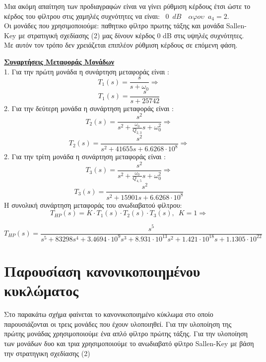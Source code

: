 \documentclass{article}
\begin{document}
{{\large{}
Μια ακόμη απαίτηση των προδιαγραφών είναι να γίνει ρύθμιση κέρδους έτσι ώστε το κέρδος του φίλτρου
στις χαμηλές συχνότητες να είναι: $\boxed{\enspace 0 \enspace dB \enspace} \enspace αφου \enspace a_4 =2$. \\
Οι μονάδες που χρησιμοποιούμε: παθητικο φίλτρο πρωτης τάξης και μονάδα Sallen-Key με  στρατιγική σχεδίασης (2) μας δίνουν κέρδος 0 dB στις υψηλές συχνότητες. Με αυτόν τον τρόπο δεν χρειάζεται επιπλέον ρύθμιση κέρδους σε επόμενη φάση. \\[0.4\baselineskip]
\large{ \underline{\textbf{Συναρτήσεις Μεταφοράς Μονάδων}} \\[0.4\baselineskip]
\large{}
1. Για την πρώτη μονάδα η συνάρτηση μεταφοράς είναι :
\begin{equation*}
T_1(s) = \frac{s}{s+ω_{0}} \Rightarrow
\end{equation*}
 \begin{equation*}
\boxed{T_1(s) = \frac{s}{s+25742} }
\end{equation*}
2. Για την δεύτερη μονάδα η συνάρτηση μεταφοράς είναι :
\begin{equation*}
T_2(s) = \frac{s^2}{s^2+ \frac{ω_{0}}{Q_{2,3}}s+ {ω_{0}^2}} \Rightarrow
\end{equation*}
\begin{equation*}
\boxed{T_2(s) = \frac{s^2}{s^2+ 41655s+ 6.6268 \cdot 10^8}} \Rightarrow
\end{equation*}
2. Για την τρίτη μονάδα η συνάρτηση μεταφοράς είναι :
\begin{equation*}
T_3(s) = \frac{s^2}{s^2+ \frac{ω_{0}}{Q_{4,5}}s+ {ω_{0}^2}}
\Rightarrow
\end{equation*}
\begin{equation*}
\boxed{T_3(s) =  \frac{s^2}{s^2+ 15901s+ 6.6268 \cdot 10^8}}
\end{equation*}
Η συνολική συνάρτηση μεταφοράς του ανωδιαβατού φίλτρου:
\begin{equation*}
T_{HP}(s) = Κ \cdot T_1(s) \cdot T_2(s) \cdot T_3(s), \enspace K=1
 \Rightarrow
\end{equation*}
\begin{changemargin}{-1.6cm}{0.5cm}
\begin{equation*}
\boxed{T_{HP}(s) = \frac{s^5}{s^5+83298s^4+3.4694\cdot10^9s^3+8.931\cdot 10^{13}s^2 + 1.421\cdot 10^{18}s +1.1305\cdot 10^{22}}}
\end{equation*}
\end{changemargin}
\newpage
\section*{Παρουσίαση κανονικοποιημένου κυκλώματος}
Στο παρακάτω σχήμα φαίνεται το κανονικοποιημένο κύκλωμα στο οποίο παρουσιάζονται οι τρεις μονάδες που έχουν υλοποιηθεί. Για την υλοποίηση της πρώτης μονάδας χρησιμοποιούμε ένα απλό φίλτρο πρώτης τάξης. Για την υλοποίηση των μονάδων δυο και τρια χρησιμοποιούμε το ανωδιαβατό φίλτρο Sallen-Key με βάση την στρατηγικη  σχεδίασης  (2) 

}}}
\end{document}
